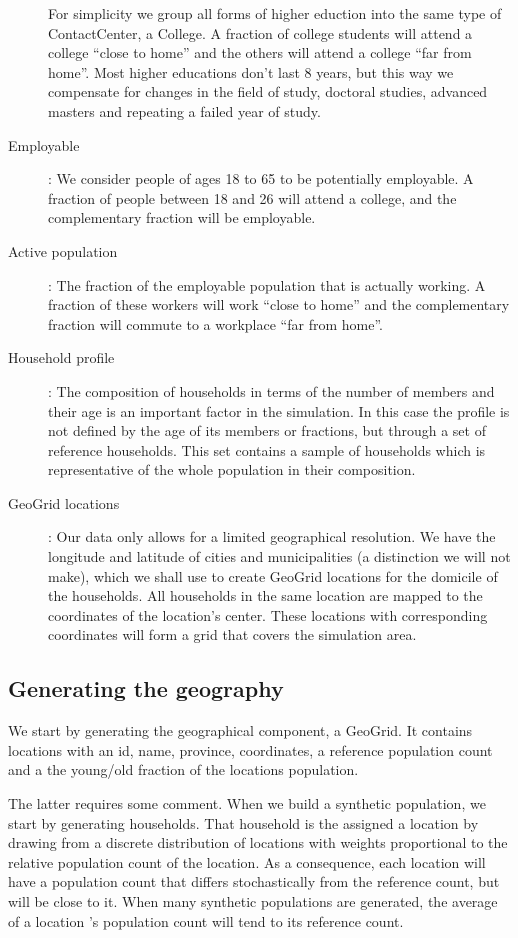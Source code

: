 \begin{description}
        For simplicity we group all forms of higher eduction into the same type of ContactCenter, a College.
        A fraction of college students will attend a college ``close to home'' and the others will attend a
        college ``far from home''. Most higher educations don't last 8 years, but this way we compensate
        for changes in the field of study, doctoral studies, advanced masters and repeating a failed year of study.
    \item[Employable]:
        We consider people of ages 18 to 65 to be potentially employable. A fraction of people between 18 and 26
        will attend a college, and the complementary fraction will be employable.
    \item[Active population]:
        The fraction of the employable population that is actually working. A fraction of these workers will
        work ``close to home'' and the complementary fraction will commute to a workplace ``far from home''.
    \item[Household profile]:
        The composition of households in terms of the number of members and their age is an important
        factor in the simulation. In this case the profile is not defined by the age of its members or fractions,
        but through a set of reference households. This set contains a sample of households which is
        representative of the whole population in their composition.
    \item[GeoGrid locations]:
        Our data only allows for a limited geographical resolution. We have the longitude and latitude of cities
        and municipalities (a distinction we will not make), which we shall use to create GeoGrid locations for
        the domicile of the households. All households in the same location are mapped to the coordinates
        of the location's center. These locations with corresponding coordinates will form a grid that covers
        the simulation area.
\end{description}

\subsection{Generating the geography}
\label{subsection:gengeo}
We start by generating the geographical component, a GeoGrid.
It contains locations with an id, name, province, coordinates, a reference population count and a the young/old fraction of the locations population.

The latter requires some comment. When we build a synthetic population, we start by generating households. That household is the assigned a location by drawing from a discrete distribution of locations with weights proportional to the  relative population count of the location. As a consequence, each location will have a population count that differs stochastically from the reference count, but will be close to it. When many synthetic populations are generated, the average of a location 's population count will tend to its reference count.

